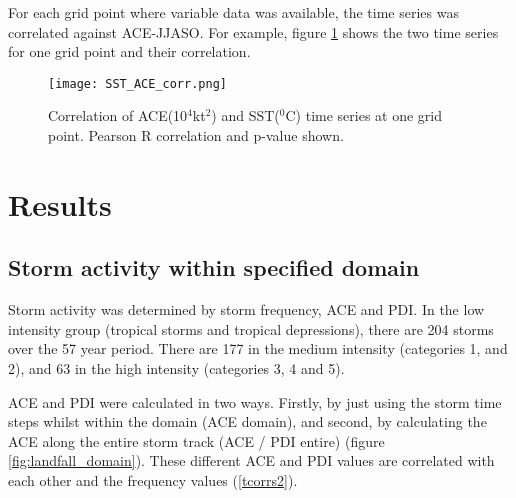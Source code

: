 

For each grid point where variable data was available, the time series was correlated against ACE-JJASO. For example, figure \ref{fig:corr_graph} shows the two time series for one grid point and their correlation. %


\begin{figure}
	\centering
	\noindent\texttt{[image: SST\_ACE\_corr.png]}
	\caption{Correlation of ACE(10$^4$kt$^2$) and SST($^0$C) time series at one grid point. Pearson R correlation and p-value shown.}\label{fig:corr_graph}
\end{figure}




\section{Results}

\subsection{Storm activity within specified domain}

Storm activity was determined by storm frequency, ACE and PDI. In the low intensity group (tropical storms and tropical depressions), there are 204 storms over the 57 year period. There are 177 in the medium intensity (categories 1, and 2), and 63 in the high intensity (categories 3, 4 and 5).

ACE and PDI were calculated in two ways. Firstly, by just using the storm time steps whilst within the domain (ACE domain), and second, by calculating the ACE along the entire storm track (ACE / PDI entire) (figure \ref{fig:landfall_domain}). These different ACE and PDI values are correlated with each other and the frequency values (\ref{tcorrs2}).



